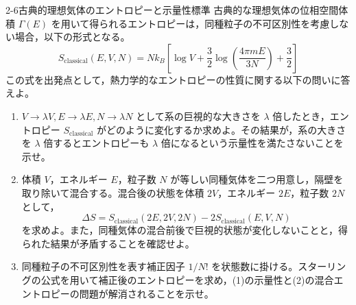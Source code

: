 
\begin{mondai}{2-6}{古典的理想気体のエントロピーと示量性}{標準}
古典的な理想気体の位相空間体積 $\Gamma(E)$ を用いて得られるエントロピーは，同種粒子の不可区別性を考慮しない場合，以下の形式となる。
\begin{equation*}
S_{\mathrm{classical}}(E, V, N) = N k_B \left[ \log V + \frac{3}{2} \log \left( \frac{4\pi m E}{3N} \right) + \frac{3}{2} \right]
\end{equation*}
この式を出発点として，熱力学的なエントロピーの性質に関する以下の問いに答えよ。

\begin{enumerate}
  \item $V \to \lambda V, E \to \lambda E, N \to \lambda N$ として系の巨視的な大きさを $\lambda$ 倍したとき，エントロピー $S_{\mathrm{classical}}$ がどのように変化するか求めよ。その結果が，系の大きさを $\lambda$ 倍するとエントロピーも $\lambda$ 倍になるという示量性を満たさないことを示せ。

  \item 体積 $V$，エネルギー $E$，粒子数 $N$ が等しい同種気体を二つ用意し，隔壁を取り除いて混合する。混合後の状態を体積 $2V$，エネルギー $2E$，粒子数 $2N$ として，
  \begin{equation*}
  \Delta S=S_{\mathrm{classical}}(2E,2V,2N)-2S_{\mathrm{classical}}(E,V,N)
  \end{equation*}
  を求めよ。また，同種気体の混合前後で巨視的状態が変化しないことと，得られた結果が矛盾することを確認せよ。

  \item 同種粒子の不可区別性を表す補正因子 $1/N!$ を状態数に掛ける。スターリングの公式を用いて補正後のエントロピーを求め，(1)の示量性と(2)の混合エントロピーの問題が解消されることを示せ。
\end{enumerate}
\end{mondai}

